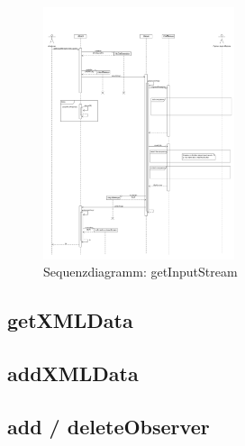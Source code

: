 \begin{figure}[!h]
	\centering
	\label{dia:design:frontend:sqc:getInputStream}
	\includegraphics[width=0.5\textwidth]{design/frontend/sequence/get-input-stream-sequence.pdf}
	\caption{Sequenzdiagramm: getInputStream}
\end{figure}

\subsection {getXMLData}

\subsection {addXMLData}

\subsection {add / deleteObserver}

